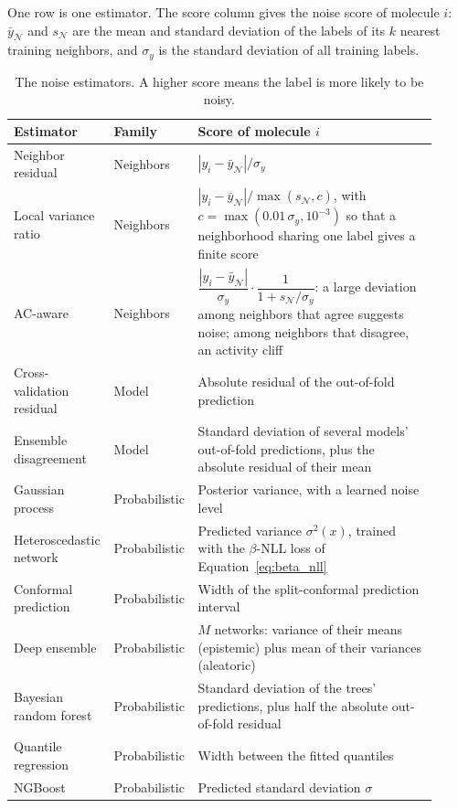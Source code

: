 One row is one estimator. The score column gives the noise score of molecule $i$: $\bar y_{\mathcal{N}}$ and $s_{\mathcal{N}}$ are the mean and standard deviation of the labels of its $k$ nearest training neighbors, and $\sigma_y$ is the standard deviation of all training labels.
\begin{table}[htbp]
\centering
\small
\caption[The noise estimators.]{The noise estimators. A higher score means the label is more likely to be noisy.}
\label{tab:noise_estimators}
\begin{adjustbox}{max width=\textwidth}
\begin{tabular}{@{}P{0.2\linewidth}P{0.15\linewidth}P{0.57\linewidth}@{}}
\toprule
Estimator & Family & Score of molecule $i$ \\
\midrule
Neighbor residual & Neighbors & $|y_i - \bar y_{\mathcal{N}}| / \sigma_y$ \\
Local variance ratio & Neighbors & $|y_i - \bar y_{\mathcal{N}}| / \max(s_{\mathcal{N}}, c)$, with $c = \max(0.01\,\sigma_y, 10^{-3})$ so that a neighborhood sharing one label gives a finite score \\
AC-aware & Neighbors & $\dfrac{|y_i - \bar y_{\mathcal{N}}|}{\sigma_y} \cdot \dfrac{1}{1 + s_{\mathcal{N}}/\sigma_y}$: a large deviation among neighbors that agree suggests noise; among neighbors that disagree, an activity cliff \citep{Dablander2023} \\
Cross-validation residual & Model & Absolute residual of the out-of-fold prediction \\
Ensemble disagreement & Model & Standard deviation of several models' out-of-fold predictions, plus the absolute residual of their mean \\
Gaussian process & Probabilistic & Posterior variance, with a learned noise level \citep{gauche} \\
Heteroscedastic network & Probabilistic & Predicted variance $\sigma^2(x)$, trained with the $\beta$-NLL loss of Equation~\ref{eq:beta_nll} \citep{Seitzer2022} \\
Conformal prediction & Probabilistic & Width of the split-conformal prediction interval \citep{Shafer2008} \\
Deep ensemble & Probabilistic & $M$ networks: variance of their means (epistemic) plus mean of their variances (aleatoric) \citep{lakshminarayanan2017} \\
Bayesian random forest & Probabilistic & Standard deviation of the trees' predictions, plus half the absolute out-of-fold residual \citep{taddy2015} \\
Quantile regression & Probabilistic & Width between the fitted quantiles \\
NGBoost & Probabilistic & Predicted standard deviation $\sigma$ \citep{Duan2020} \\
\bottomrule
\end{tabular}
\end{adjustbox}
\end{table}

